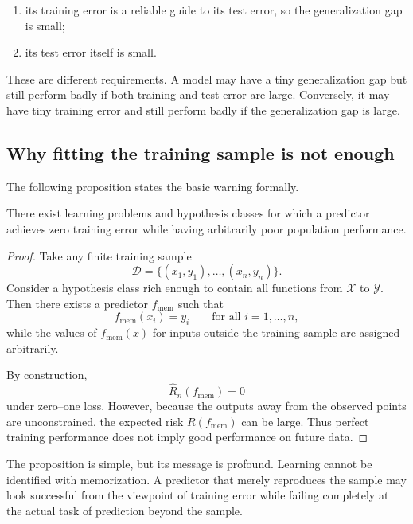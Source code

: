 \begin{enumerate}
    \item its training error is a reliable guide to its test error, so the generalization gap is small;
    \item its test error itself is small.
\end{enumerate}

These are different requirements. A model may have a tiny generalization gap but still perform badly if both training and test error are large. Conversely, it may have tiny training error and still perform badly if the generalization gap is large.

\subsection*{Why fitting the training sample is not enough}

The following proposition states the basic warning formally.

\begin{proposition}
There exist learning problems and hypothesis classes for which a predictor achieves zero training error while having arbitrarily poor population performance.
\end{proposition}

\begin{proof}
Take any finite training sample
\[
\mathcal D=\{(x_1,y_1),\dots,(x_n,y_n)\}.
\]
Consider a hypothesis class rich enough to contain all functions from $\mathcal X$ to $\mathcal Y$. Then there exists a predictor $f_{\mathrm{mem}}$ such that
\[
f_{\mathrm{mem}}(x_i)=y_i
\qquad\text{for all } i=1,\dots,n,
\]
while the values of $f_{\mathrm{mem}}(x)$ for inputs outside the training sample are assigned arbitrarily.

By construction,
\[
\widehat R_n(f_{\mathrm{mem}})=0
\]
under zero--one loss. However, because the outputs away from the observed points are unconstrained, the expected risk $R(f_{\mathrm{mem}})$ can be large. Thus perfect training performance does not imply good performance on future data.
\end{proof}

The proposition is simple, but its message is profound. Learning cannot be identified with memorization. A predictor that merely reproduces the sample may look successful from the viewpoint of training error while failing completely at the actual task of prediction beyond the sample.

